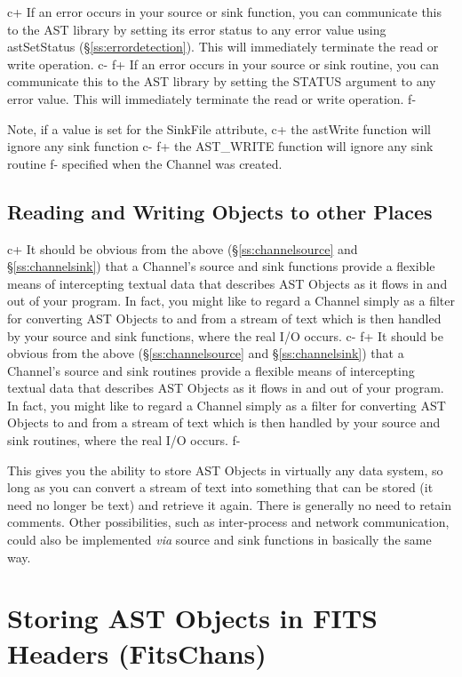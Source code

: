 \documentclass[twoside,11pt]{starlink}
\providecommand{\secref}[1]{\S\ref{#1}}
\begin{document}
{c+
If an error occurs in your source or sink function, you can
communicate this to the AST library by setting its error status to any
error value using astSetStatus (\secref{ss:errordetection}). This will
immediately terminate the read or write operation.
c-
f+
If an error occurs in your source or sink routine, you can communicate
this to the AST library by setting the STATUS argument to any error
value. This will immediately terminate the read or write operation.
f-

Note, if a value is set for the SinkFile attribute,
c+
the astWrite function will ignore any sink function
c-
f+
the AST\_WRITE function will ignore any sink routine
f-
specified when the Channel was created.

\subsection{\label{ss:otherplaces}Reading and Writing Objects to other Places}

c+
It should be obvious from the above (\secref{ss:channelsource} and
\secref{ss:channelsink}) that a Channel's source and sink functions
provide a flexible means of intercepting textual data that describes
AST Objects as it flows in and out of your program. In fact, you might
like to regard a Channel simply as a filter for converting AST Objects
to and from a stream of text which is then handled by your source and
sink functions, where the real I/O occurs.
c-
f+
It should be obvious from the above (\secref{ss:channelsource} and
\secref{ss:channelsink}) that a Channel's source and sink routines
provide a flexible means of intercepting textual data that describes
AST Objects as it flows in and out of your program. In fact, you might
like to regard a Channel simply as a filter for converting AST Objects
to and from a stream of text which is then handled by your source and
sink routines, where the real I/O occurs.
f-

This gives you the ability to store AST Objects in virtually any data
system, so long as you can convert a stream of text into something
that can be stored (it need no longer be text) and retrieve it
again. There is generally no need to retain comments.  Other
possibilities, such as inter-process and network communication, could
also be implemented \emph{via} source and sink functions in basically
the same way.

\cleardoublepage
\section{\label{ss:nativefits}Storing AST Objects in FITS Headers (FitsChans)}

}
\end{document}
